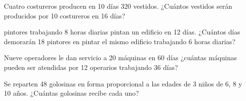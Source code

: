 \documentclass[sin nombre]{plantilla-evaluacion-v1}
\begin{document}
\begin{partes}
  \parte Cuatro costureros producen en 10 días 320 vestidos. ¿Cuántos vestidos serán
  producidos por 10 costureros en 16 días?
  \begin{malla}[height=3.7cm]
  \end{malla}
   pintores trabajando 8 horas diarias pintan un edificio en 12 días.
  ¿Cuántos días demorarán 18 pintores en pintar el mismo edificio 
  trabajando 6 horas diarias?
  \begin{malla}[height=3.7cm]
  \end{malla}
  \parte Nueve operadores le dan servicio a 20 máquinas en 60 días ¿cuántas 
  máquinas pueden ser atendidas por 12 operarios trabajando 36 días?
  \begin{malla}[height=3.7cm]
  \end{malla}
  \parte Se reparten 48 golosinas en forma proporcional a las edades de 3 niños
  de 6, 8 y 10 años. ¿Cuántas golosinas recibe cada uno?
  \begin{malla}[height=3.7cm]
  \end{malla}
\end{partes}
\end{document}
